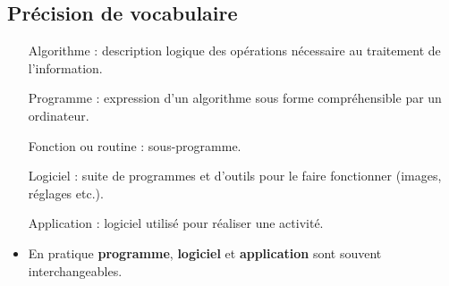 \subsection{Précision de vocabulaire}
\begin{slide}
	\small
	\begin{itemize}
		\item[Algorithme] : description logique des opérations nécessaire au traitement de l'information.
		\item[Programme] : expression d'un algorithme sous forme compréhensible par un ordinateur.
		\item[Fonction ou routine] : sous-programme.
		\item[Logiciel] : suite de programmes et d'outils pour le faire fonctionner (images, réglages etc.).
		\item[Application] : logiciel utilisé pour réaliser une activité. %
		\item En pratique \textbf{programme}, \textbf{logiciel} et \textbf{application} sont souvent interchangeables.
	\end{itemize}

\end{slide}
